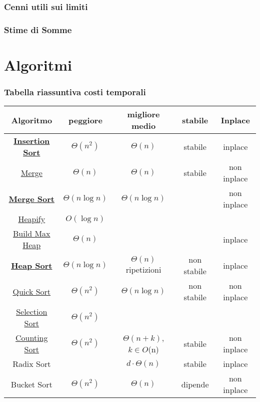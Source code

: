 \documentclass{article}
\begin{document}
\section{Cenni utili sui limiti}

\section{Stime di Somme}
\newpage
\part{Algoritmi}
\section{Tabella riassuntiva costi temporali} %
\begin{tabular}{|c|c|c|c|c|}
    \hline
    \textbf{Algoritmo} & \textbf{peggiore} & \textbf{ migliore medio} & \textbf{stabile } & \textbf{Inplace}\\
    \hline
    \hyperlink{insertionsort}{\textbf{Insertion Sort}} & $\Theta(n^2)$ & $\Theta(n)$ & stabile & inplace\\ 
    \hyperlink{merge}{Merge} & $\Theta(n)$ & $\Theta(n)$ & stabile & non inplace\\
    \hyperlink{mergesort}{\textbf{Merge Sort}}& $\Theta(n \log n)$ & $\Theta(n \log n)$ & & non inplace\\
    \hyperlink{heapify}{Heapify} & $O(\log n)$ & & & \\
    \hyperlink{buildmaxheap}{Build Max Heap} & $\Theta(n)$ & & & inplace \\ 
    \hyperlink{heapsort}{\textbf{Heap Sort}} & $\Theta(n \log n)$ & $\Theta(n)$ ripetizioni & non stabile & inplace\\
    \hyperlink{quicksort}{Quick Sort} & $\Theta(n^2)$ & $\Theta(n \log n)$ & non stabile &non inplace \\
    \hyperlink{selection}{Selection Sort} & $\Theta(n^2)$ & & & \\
    \hyperlink{countingsort}{Counting Sort} & $\Theta(n^2)$  & $\Theta(n+k)$, $k \in O$(n) & stabile & non inplace\\    
    Radix Sort &  & $d \cdot \Theta(n)$ & stabile & inplace \\
    Bucket Sort & $\Theta(n^2)$ & $\Theta(n)$ & dipende & non inplace\\
    \hline

\end{tabular}
\newpage
\end{document}
